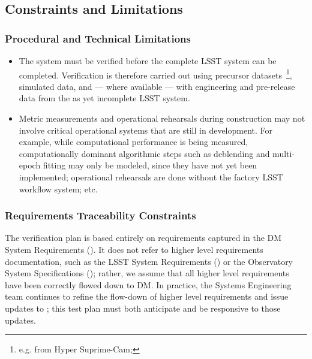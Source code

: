 \subsection{Constraints and Limitations}

\subsubsection{Procedural and Technical Limitations}

\begin{itemize}


  \item{The \product{} system must be verified before the complete LSST system can be completed. Verification is therefore carried out using precursor datasets~\footnote{e.g. from Hyper Suprime-Cam; }, simulated data, and --- where available --- with engineering and pre-release data from the as yet incomplete LSST system.}

  \item{Metric measurements and operational rehearsals during construction may not involve critical operational systems that are still in development. For example, while computational performance is being measured, computationally dominant algorithmic steps such as deblending and multi-epoch fitting may only be modeled, since they have not yet been implemented; operational rehearsals are done without the factory LSST workflow system; etc.}

\end{itemize}

\subsubsection{Requirements Traceability Constraints}

The \product{} verification plan is based entirely on requirements captured in the DM System Requirements ().
It does not refer to higher level requirements documentation, such as the LSST System Requirements () or the Observatory System Specifications (); rather, we assume that all higher level requirements have been correctly flowed down to DM.
In practice, the Systems Engineering team continues to refine the flow-down of higher level requirements and issue updates to ; this test plan must both anticipate and be responsive to those updates.
